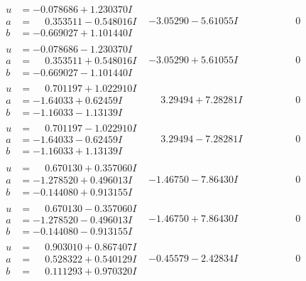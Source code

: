 \documentclass[1p]{elsarticle_modified}
\theoremstyle{definition}
\begin{document}
$$\begin{array}{c|c|c}
\begin{aligned}
u &= -0.078686 + 1.230370 I \\
a &= \phantom{-}0.353511 - 0.548016 I \\
b &= -0.669027 + 1.101440 I\end{aligned}
 & -3.05290 - 5.61055 I & \phantom{-0.000000 } 0 \\ \hline\begin{aligned}
u &= -0.078686 - 1.230370 I \\
a &= \phantom{-}0.353511 + 0.548016 I \\
b &= -0.669027 - 1.101440 I\end{aligned}
 & -3.05290 + 5.61055 I & \phantom{-0.000000 } 0 \\ \hline\begin{aligned}
u &= \phantom{-}0.701197 + 1.022910 I \\
a &= -1.64033 + 0.62459 I \\
b &= -1.16033 - 1.13139 I\end{aligned}
 & \phantom{-}3.29494 + 7.28281 I & \phantom{-0.000000 } 0 \\ \hline\begin{aligned}
u &= \phantom{-}0.701197 - 1.022910 I \\
a &= -1.64033 - 0.62459 I \\
b &= -1.16033 + 1.13139 I\end{aligned}
 & \phantom{-}3.29494 - 7.28281 I & \phantom{-0.000000 } 0 \\ \hline\begin{aligned}
u &= \phantom{-}0.670130 + 0.357060 I \\
a &= -1.278520 + 0.496013 I \\
b &= -0.144080 + 0.913155 I\end{aligned}
 & -1.46750 - 7.86430 I & \phantom{-0.000000 } 0 \\ \hline\begin{aligned}
u &= \phantom{-}0.670130 - 0.357060 I \\
a &= -1.278520 - 0.496013 I \\
b &= -0.144080 - 0.913155 I\end{aligned}
 & -1.46750 + 7.86430 I & \phantom{-0.000000 } 0 \\ \hline\begin{aligned}
u &= \phantom{-}0.903010 + 0.867407 I \\
a &= \phantom{-}0.528322 + 0.540129 I \\
b &= \phantom{-}0.111293 + 0.970320 I\end{aligned}
 & -0.45579 - 2.42834 I & \phantom{-0.000000 } 0\\

\end{array}$$
\end{document}
